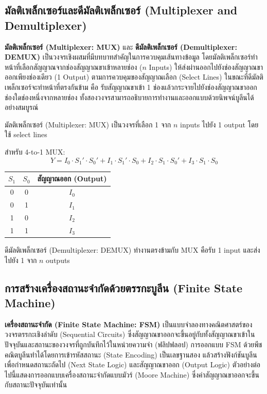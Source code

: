 \subsection{มัลติเพล็กเซอร์และดีมัลติเพล็กเซอร์ (Multiplexer and Demultiplexer)}
\textbf{มัลติเพล็กเซอร์ (Multiplexer: MUX)} และ \textbf{ดีมัลติเพล็กเซอร์ (Demultiplexer: DEMUX)} เป็นวงจรเชิงผสมที่มีบทบาทสำคัญในการควบคุมเส้นทางข้อมูล โดยมัลติเพล็กเซอร์ทำหน้าที่เลือกสัญญาณจากช่องสัญญาณขาเข้าหลายช่อง ($n$ Inputs) ให้ส่งผ่านออกไปยังช่องสัญญาณขาออกเพียงช่องเดียว (1 Output) ตามการควบคุมของสัญญาณเลือก (Select Lines) ในขณะที่ดีมัลติเพล็กเซอร์จะทำหน้าที่ตรงกันข้าม คือ รับสัญญาณขาเข้า 1 ช่องแล้วกระจายไปยังช่องสัญญาณขาออกช่องใดช่องหนึ่งจากหลายช่อง ทั้งสองวงจรสามารถอธิบายการทำงานและออกแบบด้วยนิพจน์บูลีนได้อย่างสมบูรณ์~\parencite{wakerly2018digital}

\begin{definition}
มัลติเพล็กเซอร์ (Multiplexer: MUX) เป็นวงจรที่เลือก 1 จาก $n$ inputs ไปยัง 1 output โดยใช้ select lines

สำหรับ 4-to-1 MUX:
$$Y = I_0 \cdot S_1' \cdot S_0' + I_1 \cdot S_1' \cdot S_0 + I_2 \cdot S_1 \cdot S_0' + I_3 \cdot S_1 \cdot S_0$$

\begin{center}
\begin{tabular}{|c|c|c|}
\hline
$S_1$ & $S_0$ & สัญญาณออก (Output) \\
\hline
0 & 0 & $I_0$ \\
\hline
0 & 1 & $I_1$ \\
\hline
1 & 0 & $I_2$ \\
\hline
1 & 1 & $I_3$ \\
\hline
\end{tabular}
\end{center}
\end{definition}

\begin{definition}
ดีมัลติเพล็กเซอร์ (Demultiplexer: DEMUX) ทำงานตรงข้ามกับ MUX คือรับ 1 input และส่งไปยัง 1 จาก $n$ outputs
\end{definition}

\subsection{การสร้างเครื่องสถานะจำกัดด้วยตรรกะบูลีน (Finite State Machine)}
\textbf{เครื่องสถานะจำกัด (Finite State Machine: FSM)} เป็นแบบจำลองทางคณิตศาสตร์ของวงจรตรรกะเชิงลำดับ (Sequential Circuits) ซึ่งสัญญาณขาออกจะขึ้นอยู่กับทั้งสัญญาณขาเข้าในปัจจุบันและสถานะของวงจรที่ถูกบันทึกไว้ในหน่วยความจำ (ฟลิปฟลอป) การออกแบบ FSM ด้วยพีชคณิตบูลีนทำได้โดยการเข้ารหัสสถานะ (State Encoding) เป็นเลขฐานสอง แล้วสร้างฟังก์ชันบูลีนเพื่อกำหนดสถานะถัดไป (Next State Logic) และสัญญาณขาออก (Output Logic) ตัวอย่างต่อไปนี้แสดงการออกแบบเครื่องสถานะจำกัดแบบมัวร์ (Moore Machine) ซึ่งค่าสัญญาณขาออกจะขึ้นกับสถานะปัจจุบันเท่านั้น~\parencite{wakerly2018digital}

